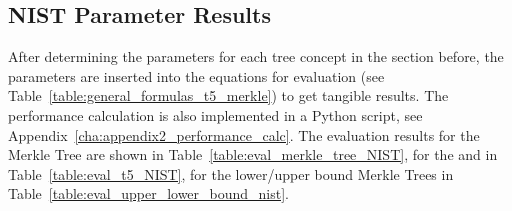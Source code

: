 
\subsection{NIST Parameter Results}
After determining the parameters for each tree concept in the section before, the parameters are inserted into the equations for evaluation (see Table~\ref{table:general_formulas_t5_merkle}) to get tangible results. The performance calculation is also implemented in a Python script, see Appendix~\ref{cha:appendix2_performance_calc}.
The evaluation results for the Merkle Tree are shown in Table~\ref{table:eval_merkle_tree_NIST}, for the \tftree and \extree in Table~\ref{table:eval_t5_NIST}, for the lower/upper bound Merkle Trees in Table~\ref{table:eval_upper_lower_bound_nist}.

